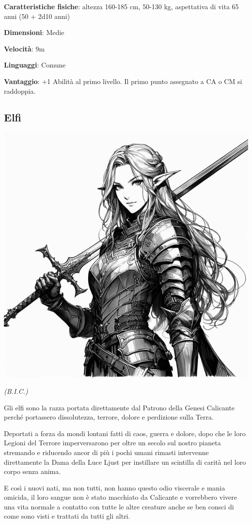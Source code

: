 \begin{multicols}{2}
\textbf{Caratteristiche fisiche}: altezza 160-185 cm, 50-130 kg, aspettativa di vita 65 anni (50 + 2d10 anni)

\textbf{Dimensioni}: Medie

\textbf{Velocità}: 9m

\textbf{Linguaggi}: Comune

\textbf{Vantaggio}: +1 Abilità al primo livello. Il primo punto assegnato a CA o CM si raddoppia.

\subsection{Elfi}\label{elfi}

\begin{center}
\includegraphics[height=0.7\linewidth]{immagini/elfa3-ai.png}

\emph{(B.I.C.)}
\end{center}

Gli elfi sono la razza portata direttamente dal Patrono della Genesi Calicante perché portassero dissolutezza, terrore, dolore e perdizione sulla Terra.

Deportati a forza da mondi lontani fatti di caos, guerra e dolore, dopo che le loro Legioni del Terrore imperversarono per oltre un secolo sul nostro pianeta stremando e riducendo ancor di più i pochi umani rimasti intervenne direttamente la Dama della Luce Ljust per instillare un scintilla di carità nel loro corpo senza anima.

E così i nuovi nati, ma non tutti, non hanno questo odio viscerale e mania omicida, il loro sangue non è stato macchiato da Calicante e vorrebbero vivere una vita normale a contatto con tutte le altre creature anche se ben consci di come sono visti e trattati da tutti gli altri.


\end{multicols}
